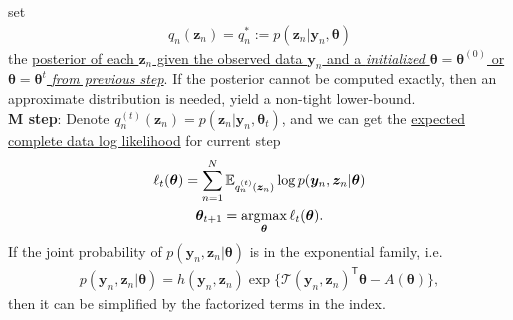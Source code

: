 set 
\begin{gather}
    q_n(\bm{z}_n)=q_n^*:=p(\bm{z}_n|\bm{y}_n,\bm{\theta})
\end{gather} 
the \uline{posterior of each $\bm{z}_{n}$
given the observed data $\bm{y}_n$ and a \textit{initialized} $\bm{\theta}=\bm{\theta}^{(0)}$ or $\bm{\theta}=\bm{\theta}^{t}$ \textit{from previous step}}.
If the posterior cannot be computed exactly, then an approximate distribution is needed, yield a non-tight lower-bound.\\
\textbf{M step}: 
Denote $q^{(t)}_n(\bm{z}_n)=p(\bm{z}_n|\bm{y}_n,\bm{\theta}_{t})$, and we can get the \uline{expected complete data log likelihood} for current step
\begin{gather}
    \ell_{t}(\bm{\theta})=\sum_{n=1}^N\mathbb{E}_{q^{(t)}_n(\bm{z}_n)}\log p(\bm{y}_n,\bm{z}_n|\bm{\theta})\\
    \bm{\theta}_{t+1}=\operatorname*{\arg\!max}_{\bm{\theta}}\ell_{t}(\bm{\theta}).
\end{gather}
If the joint probability of $p(\bm{y}_n,\bm{z}_n|\bm{\theta})$ is in the exponential family,
i.e. 
\begin{gather}
    p(\bm{y}_n,\bm{z}_n|\bm{\theta})=h(\bm{y}_n,\bm{z}_n)\exp\{\mathcal{T}(\bm{y}_n,\bm{z}_n)^\mathsf{T}\bm{\theta}-A(\bm{\theta})\},
\end{gather}
then it can be simplified by the factorized terms in the index.




